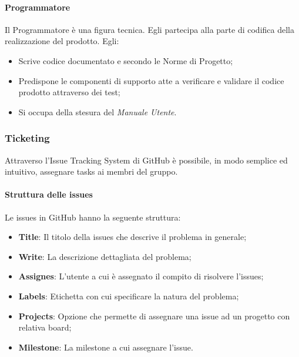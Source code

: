                 \paragraph{Programmatore}
                    Il Programmatore è una figura tecnica. Egli partecipa alla parte di codifica della realizzazione del prodotto. Egli:
                    \begin{itemize}
                        \item Scrive codice documentato e secondo le Norme di Progetto;
                        \item Predispone le componenti di supporto atte a verificare e validare il codice prodotto attraverso dei test;
                        \item Si occupa della stesura del \textit{Manuale Utente}.
                    \end{itemize}
                \subsubsection{Ticketing}
                    Attraverso l'Issue Tracking System di GitHub è possibile, in modo semplice ed intuitivo, assegnare tasks ai membri del gruppo.
                    \paragraph{Struttura delle issues}
                        Le issues in GitHub hanno la seguente struttura:
                            \begin{itemize}
                                \item \textbf{Title}: Il titolo della issues che descrive il problema in generale;
                                \item \textbf{Write}: La descrizione dettagliata del problema;
                                \item \textbf{Assignes}: L'utente a cui è assegnato il compito di risolvere l'issues;
                                \item \textbf{Labels}: Etichetta con cui specificare la natura del problema;
                                \item \textbf{Projects}: Opzione che permette di assegnare una issue ad un progetto con relativa board;
                                \item \textbf{Milestone}: La milestone a cui assegnare l'issue. 
                            \end{itemize}
